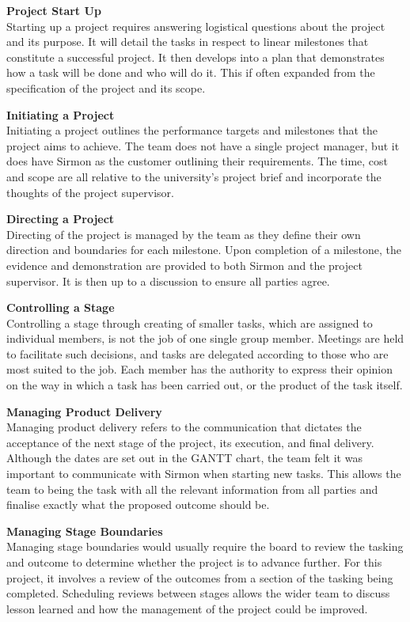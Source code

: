 \documentclass [12pt]{article}
\begin{document}
\textbf{Project Start Up}\\
Starting up a project requires answering logistical questions about the project and its purpose. It will detail the tasks in respect to linear milestones that constitute a successful project. It then develops into a plan that demonstrates how a task will be done and who will do it. This if often expanded from the specification of the project and its scope.

\textbf{Initiating a Project}\\
Initiating a project outlines the performance targets and milestones that the project aims to achieve. The team does not have a single project manager, but it does have Sirmon as the customer outlining their requirements. The time, cost and scope are all relative to the university’s project brief and incorporate the thoughts of the project supervisor.

\textbf{Directing a Project}\\
Directing of the project is managed by the team as they define their own direction and boundaries for each milestone. Upon completion of a milestone, the evidence and demonstration are provided to both Sirmon and the project supervisor. It is then up to a discussion to ensure all parties agree.

\textbf{Controlling a Stage}\\
Controlling a stage through creating of smaller tasks, which are assigned to individual members, is not the job of one single group member. Meetings are held to facilitate such decisions, and tasks are delegated according to those who are most suited to the job. Each member has the authority to express their opinion on the way in which a task has been carried out, or the product of the task itself.

\textbf{Managing Product Delivery}\\
Managing product delivery refers to the communication that dictates the acceptance of the next stage of the project, its execution, and final delivery. Although the dates are set out in the GANTT chart, the team felt it was important to communicate with Sirmon when starting new tasks. This allows the team to being the task with all the relevant information from all parties and finalise exactly what the proposed outcome should be.

\textbf{Managing Stage Boundaries}\\
Managing stage boundaries would usually require the board to review the tasking and outcome to determine whether the project is to advance further. For this project, it involves a review of the outcomes from a section of the tasking being completed. Scheduling reviews between stages allows the wider team to discuss lesson learned and how the management of the project could be improved.
\end{document}
